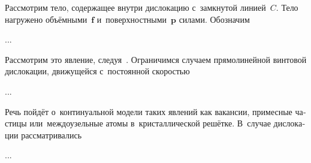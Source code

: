 

\label{para:actionofstressfieldondislocation}

\begin{otherlanguage}{russian}

Рассмотрим тело, содержащее внутри дислокацию с~замкнутой линией~$C$.
Тело нагружено объёмными~$\bm{f}$ и~поверхностными~$\bm{p}$ силами.
Обозначим

...


\end{otherlanguage}



\label{para:dislocationmovement}

\begin{otherlanguage}{russian}

Рассмотрим это явление, следуя~\cite{cottrell-dislocations}.
Ограничимся случаем прямо\-линейной винтовой дислокации, движущейся с~постоянной скоростью

...


\end{otherlanguage}



\label{para:pointdefects}

\begin{otherlanguage}{russian}

Речь пойдёт о~континуальной модели таких явлений как вакансии, примесные частицы или~междоузельные атомы в~кристаллической решётке.
В~случае дислокации рассматривались

...


\end{otherlanguage}

